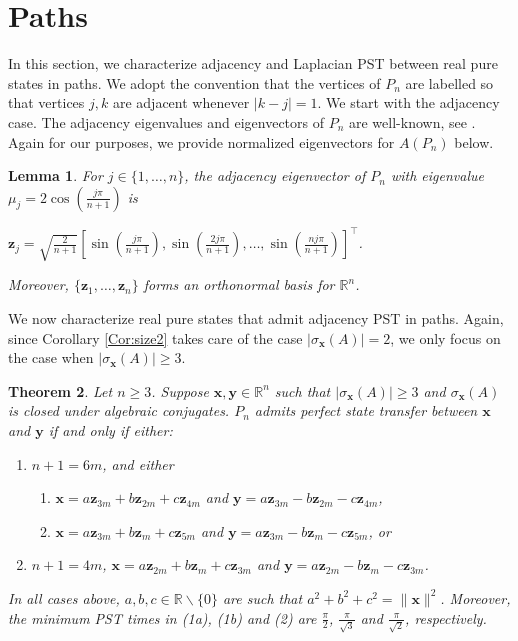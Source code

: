 \documentclass[11pt]{article}
\newtheorem{theorem}{Theorem}
\newtheorem{lemma}[theorem]{Lemma}
\newcommand{\bx}{\mathbf x}
\newcommand{\by}{\mathbf y}
\newcommand{\bz}{\mathbf z}
\def\R{\mathbb{R}}
\begin{document}
\section{Paths}\label{Sec:paths}

In this section, we characterize adjacency and Laplacian PST between real pure states in paths. We adopt the convention that the vertices of $P_n$ are labelled so that vertices $j, k$ are adjacent whenever $|k-j| = 1.$ We start with the adjacency case. The adjacency eigenvalues and eigenvectors of $P_n$ are well-known, see \cite[Section 1.4.4]{brouwer2011spectra}. Again for our purposes, we provide normalized eigenvectors for $A(P_n)$ below.

\begin{lemma}
\label{Lem:pneval}
For $j\in\{1,\ldots, n\}$, the adjacency eigenvector of $P_n$ with eigenvalue $\mu_j=2\cos\left(\frac{j\pi}{n+1}\right)$ is 
\begin{center}
$\bz_j=\sqrt{\frac{2}{n+1}}\left[\sin\left(\frac{j\pi}{n+1}\right), \sin\left(\frac{2j\pi}{n+1}\right),\ldots, \sin\left(\frac{nj\pi}{n+1}\right)\right]^\top$.
\end{center}
Moreover, $\{\bz_1,\ldots,\bz_n\}$ forms an orthonormal basis for $\R^n$.
\end{lemma}

We now characterize real pure states that admit adjacency PST in paths. Again, since Corollary \ref{Cor:size2} takes care of the case $|\sigma_{\bx}(A)|=2$, we only focus on the case when $|\sigma_{\bx}(A)|\geq 3$.

\begin{theorem}
\label{Thm:pstpaths}
Let $n\geq 3$. Suppose $\bx,\by\in\R^n$ such that $|\sigma_{\bx}(A)|\geq 3$ and $\sigma_{\bx}(A)$ is closed under algebraic conjugates. $P_n$ admits perfect state transfer between $\bx$ and $\by$ if and only if either:
\begin{enumerate}

\item $n+1=6m$, and either
\begin{enumerate}
\item $\bx=a\bz_{3m}+b\bz_{2m}+c\bz_{4m}$ and $\by=a\bz_{3m}-b\bz_{2m}-c\bz_{4m}$,
\item $\bx=a\bz_{3m}+b\bz_{m}+c\bz_{5m}$ and $\by=a\bz_{3m}-b\bz_{m}-c\bz_{5m}$, or 
\end{enumerate}
\item $n+1=4m$, $\bx=a\bz_{2m}+b\bz_{m}+c\bz_{3m}$ and $\by=a\bz_{2m}-b\bz_{m}-c\bz_{3m}$.
\end{enumerate}
In all cases above, $a,b,c\in\R\backslash\{0\}$ are such that $a^2+b^2+c^2=\|\bx\|^2$. Moreover, %
the minimum PST times in (1a), (1b) and (2) are $\frac{\pi}{2}$, $\frac{\pi}{\sqrt{3}}$ and $\frac{\pi}{\sqrt{2}}$, respectively.
\end{theorem}
\end{document}
